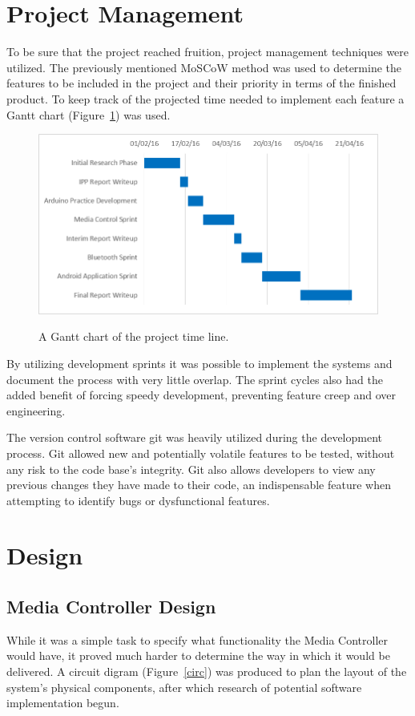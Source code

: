 \documentclass{article}
\begin{document}
	\section{Project Management}
		To be sure that the project reached fruition, project management techniques were utilized. The previously mentioned MoSCoW method was used to determine the features to be included in the project and their priority in terms of the finished product. To keep track of the projected time needed to implement each feature a Gantt chart (Figure~\ref{gantt}) was used.
		
		\begin{figure}[h]
			\centering
			{\includegraphics[scale = 0.7]{gantt}}
			\caption{A Gantt chart of the project time line.}
			\label{gantt}
		\end{figure}
				
		By utilizing development sprints it was possible to implement the systems and document the process with very little overlap. The sprint cycles also had the added benefit of forcing speedy development, preventing feature creep and over engineering. 
		
		The version control software git was heavily utilized during the development process. Git allowed new and potentially volatile features to be tested, without any risk to the code base's integrity. Git also allows developers to view any previous changes they have made to their code, an indispensable feature when attempting to identify bugs or dysfunctional features.   
		
	\section{Design}
		\subsection{Media Controller Design}
			While it was a simple task to specify what functionality the Media Controller would have, it proved much harder to determine the way in which it would be delivered. A circuit digram (Figure~\ref{circ}) was produced to plan the layout of the system's  physical components, after which research of potential software implementation begun.
			
\end{document}
